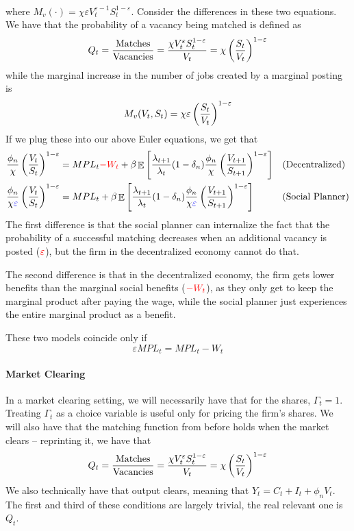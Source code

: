 \documentclass[10pt]{article}
\begin{document}
\begin{model}
\begin{align*}
	\end{align*}
	where $M_v(\cdot) = \chi \varepsilon V_t^{\varepsilon - 1}S_t^{1-\varepsilon}$. Consider the differences in these two equations. We have that the probability of a vacancy being matched is defined as
	\[
	Q_t = \frac{\text{Matches}}{\text{Vacancies}} = \frac{\chi V_t^\varepsilon S_t^{1-\varepsilon}}{V_t} = \chi \left( \frac{S_t}{V_t}\right)^{1-\varepsilon}
	\]
	while the marginal increase in the number of jobs created by a marginal posting is
	\[
	M_v(V_t,S_t) = \chi\varepsilon\left( \frac{S_t}{V_t}\right)^{1-\varepsilon}
	\]
	If we plug these into our above Euler equations, we get that
	\begin{align*}
		\frac{\phi_n}{\chi}\left( \frac{V_t}{S_t} \right)^{1-\varepsilon} &= MPL_t \textcolor{red}{ - W_t} + \beta \mathop{\mathbb{E}} \left[ \frac{\lambda_{t+1}}{\lambda_t} (1-\delta_n) \frac{\phi_n}{\chi}\left( \frac{V_{t+1}}{S_{t+1}}\right)^{1-\varepsilon}\right] &&\text{(Decentralized)} \\
		\frac{\phi_n}{\chi\textcolor{blue}{\varepsilon}}\left( \frac{V_t}{S_t} \right)^{1-\varepsilon} &= MPL_t  + \beta \mathop{\mathbb{E}} \left[ \frac{\lambda_{t+1}}{\lambda_t} (1-\delta_n) \frac{\phi_n}{\chi\textcolor{blue}{\varepsilon}}\left( \frac{V_{t+1}}{S_{t+1}}\right)^{1-\varepsilon}\right] &&\text{(Social Planner)} 
	\end{align*}
The first difference is that the social planner can internalize the fact that the probability of a successful matching decreases when an additional vacancy is posted ($\textcolor{red}{\varepsilon}$), but the firm in the decentralized economy cannot do that.

The second difference is that in the decentralized economy, the firm gets lower benefits than the marginal social benefits ($\textcolor{red}{-W_t}$), as they only get to keep the marginal product after paying the wage, while the social planner just experiences the entire marginal product as a benefit.

These two models coincide only if
\[
\varepsilon MPL_t = MPL_t - W_t
\]

\paragraph{Market Clearing} In a market clearing setting, we will necessarily have that for the shares, $\Gamma_t = 1$. Treating $\Gamma_t$ as a choice variable is useful only for pricing the firm's shares. We will also have that the matching function from before holds when the market clears -- reprinting it, we have that
\[
Q_t = \frac{\text{Matches}}{\text{Vacancies}} = \frac{\chi V_t^\varepsilon S_t^{1-\varepsilon}}{V_t} = \chi \left( \frac{S_t}{V_t}\right)^{1-\varepsilon}
\]
We also technically have that output clears, meaning that $Y_t = C_t + I_t + \phi_n V_t$. The first and third of these conditions are largely trivial, the real relevant one is $Q_t$.
\end{model}
\end{document}
